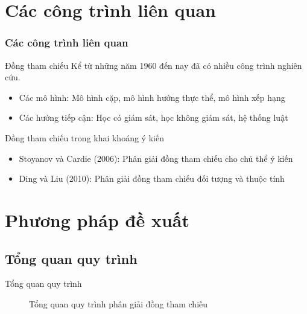 \documentclass[9pt,xcolor=table,hyperref=unicode]{beamer}
\begin{document}
	\section{Các công trình liên quan}
	\begin{frame}
		\frametitle{Các công trình liên quan}
		\begin{block}{Đồng tham chiếu}
			Kể từ những năm 1960 đến nay đã có nhiều công trình nghiên cứu.
			\begin{itemize}
				\item{Các mô hình: Mô hình cặp, mô hình hướng thực thể, mô hình xếp hạng}
				\item{Các hướng tiếp cận: Học có giám sát, học không giám sát, hệ thống luật}
			\end{itemize}
		\end{block}
		\begin{block}{Đồng tham chiếu trong khai khoáng ý kiến}
			\begin{itemize}
				\item{Stoyanov và Cardie (2006): Phân giải đồng tham chiếu cho chủ thể ý kiến \footnotemark}
				\item{Ding và Liu (2010): Phân giải đồng tham chiếu đối tượng và thuộc tính \footnotemark}
			\end{itemize}
		\end{block}
	\end{frame}

	\section{Phương pháp đề xuất}
	\subsection{Tổng quan quy trình}
	\begin{frame}{Tổng quan quy trình}		
		\begin{figure}[H]
			\LARGE 
			\centering				
			\resizebox{100mm}{!}{}
			\caption{Tổng quan quy trình phân giải đồng tham chiếu}									
		\end{figure}
	\end{frame}	
\end{document}
